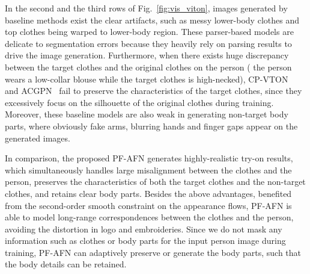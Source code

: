 \documentclass[final]{cvpr}
\begin{document}
	
	In the second and the third rows of Fig.~\ref{fig:vis_viton}, images generated by baseline methods exist the clear artifacts, such as messy lower-body clothes and top clothes being warped to lower-body region.
These parser-based models are delicate to segmentation errors because they heavily rely on parsing results to drive the image generation.
Furthermore, when there exists huge discrepancy between the target clothes and the original clothes on the person (  the person wears a low-collar blouse while the target clothes is high-necked), CP-VTON~\cite{cpvton} and ACGPN~\cite{ACGPN} fail to preserve the characteristics of the target clothes, since they excessively focus on the silhouette of the original clothes during training.
Moreover, these baseline models are also weak in generating non-target body parts, where obviously fake arms, blurring hands and finger gaps appear on the generated images.
	
In comparison, the proposed PF-AFN generates highly-realistic try-on results, which simultaneously handles large misalignment between the clothes and the person, preserves the characteristics of both the target clothes and the non-target clothes, and retains clear body parts.
Besides the above advantages, benefited from the second-order smooth constraint on the appearance flows, PF-AFN is able to model long-range correspondences between the clothes and the person, avoiding the distortion in logo and embroideries.
Since we do not mask any information such as clothes or body parts for the input person image during training, PF-AFN can adaptively preserve or generate the body parts, such that the body details can be retained.
	
\end{document}
